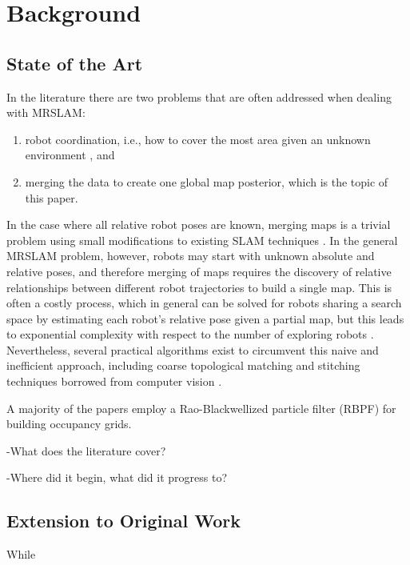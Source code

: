 \section{Background}
\label{S:Back}

\subsection{State of the Art}
\label{SS:Back:SOA}
    
In the literature there are two problems that are often addressed when dealing with MRSLAM:
\begin{enumerate}
\item robot coordination, i.e., how to cover the most area given an unknown environment \cite{julia2012comparison}, and
\item merging the data to create one global map posterior, which is the topic of this paper.
\end{enumerate}

In the case where all relative robot poses are known, merging maps is a trivial problem using small modifications to existing SLAM techniques \cite{thrun2001probabilistic}. In the general MRSLAM problem, however, robots may start with unknown absolute and relative poses, and therefore merging of maps requires the discovery of relative relationships between different robot trajectories to build a single map. This is often a costly process, which in general can be solved for robots sharing a search space by estimating each robot's relative pose given a partial map, but this leads to exponential complexity with respect to the number of exploring robots \cite{fox2006distributed}. Nevertheless, several practical algorithms exist to circumvent this naive and inefficient approach,  including coarse topological matching and stitching techniques borrowed from computer vision \cite{birk2006merging}.


A majority of the papers employ a Rao-Blackwellized particle filter (RBPF) for building occupancy grids.  


\cite{howard2006multi,birk2006merging,lazaro2013multi,lee2012probabilistic}


-What does the literature cover?

-Where did it begin, what did it progress to?




\subsection{\cite{howard2006multi} Extension to Original Work}
\label{SS:Back:Contributions}

While \cite{howard2006multi}